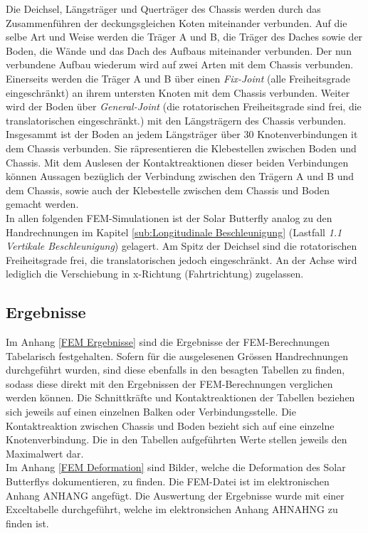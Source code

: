 Die Deichsel, Längsträger und Querträger des Chassis werden durch das Zusammenführen der deckungsgleichen Koten miteinander verbunden. Auf die selbe Art und Weise werden die Träger A und B, die Träger des Daches sowie der Boden, die Wände und das Dach des Aufbaus miteinander verbunden. Der nun verbundene Aufbau wiederum wird auf zwei Arten mit dem Chassis verbunden. Einerseits werden die Träger A und B über einen \emph{Fix-Joint} (alle Freiheitsgrade eingeschränkt) an ihrem untersten Knoten mit dem Chassis verbunden. Weiter wird der Boden über \emph{General-Joint} (die rotatorischen Freiheitsgrade sind frei, die translatorischen eingeschränkt.) mit den Längsträgern des Chassis verbunden. Insgesammt ist der Boden an jedem Längsträger über 30 Knotenverbindungen it dem Chassis verbunden. Sie räpresentieren die Klebestellen zwischen Boden und Chassis. Mit dem Auslesen der Kontaktreaktionen dieser beiden Verbindungen können Aussagen bezüglich der Verbindung zwischen den Trägern A und B und dem Chassis, sowie auch der Klebestelle zwischen dem Chassis und Boden gemacht werden.\\
In allen folgenden FEM-Simulationen ist der Solar Butterfly analog zu den Handrechnungen im Kapitel \ref{sub:Longitudinale Beschleunigung} (Lastfall \emph{1.1 Vertikale Beschleunigung}) gelagert. Am Spitz der Deichsel sind die rotatorischen Freiheitsgrade frei, die translatorischen jedoch eingeschränkt. An der Achse wird lediglich die Verschiebung in x-Richtung (Fahrtrichtung) zugelassen.

\subsection{Ergebnisse}
Im Anhang \ref{FEM Ergebnisse} sind die Ergebnisse der FEM-Berechnungen Tabelarisch festgehalten. Sofern für die ausgelesenen Grössen Handrechnungen durchgeführt wurden, sind diese ebenfalls in den besagten Tabellen zu finden, sodass diese direkt mit den Ergebnissen der FEM-Berechnungen verglichen werden können. Die Schnittkräfte und Kontaktreaktionen der Tabellen beziehen sich jeweils auf einen einzelnen Balken oder Verbindungsstelle. Die Kontaktreaktion zwischen Chassis und Boden bezieht sich auf eine einzelne Knotenverbindung. Die in den Tabellen aufgeführten Werte stellen jeweils den Maximalwert dar.\\
Im Anhang \ref{FEM Deformation} sind Bilder, welche die Deformation des Solar Butterflys dokumentieren, zu finden. Die FEM-Datei ist im elektronischen Anhang ANHANG angefügt. Die Auswertung der Ergebnisse wurde mit einer Exceltabelle durchgeführt, welche im elektronsichen Anhang AHNAHNG zu finden ist.


